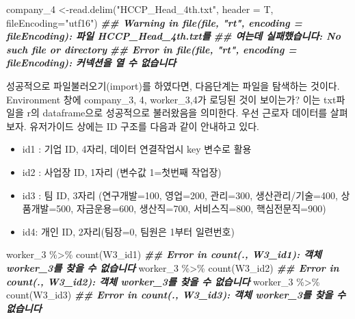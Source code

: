 \documentclass[
]{book}
\newenvironment{Shaded}{\begin{snugshade}}{\end{snugshade}}
\newcommand{\AttributeTok}[1]{\textcolor[rgb]{0.77,0.63,0.00}{#1}}
\newcommand{\DocumentationTok}[1]{\textcolor[rgb]{0.56,0.35,0.01}{\textbf{\textit{#1}}}}
\newcommand{\FunctionTok}[1]{\textcolor[rgb]{0.00,0.00,0.00}{#1}}
\newcommand{\NormalTok}[1]{#1}
\newcommand{\OtherTok}[1]{\textcolor[rgb]{0.56,0.35,0.01}{#1}}
\newcommand{\SpecialCharTok}[1]{\textcolor[rgb]{0.00,0.00,0.00}{#1}}
\newcommand{\StringTok}[1]{\textcolor[rgb]{0.31,0.60,0.02}{#1}}
\providecommand{\tightlist}{%
  \setlength{\itemsep}{0pt}\setlength{\parskip}{0pt}}
\theoremstyle{definition}
\theoremstyle{definition}
\theoremstyle{definition}
\theoremstyle{definition}
\theoremstyle{remark}
\begin{document}
\begin{Shaded}
\begin{Highlighting}[]
\NormalTok{company\_4 }\OtherTok{\textless{}{-}}\FunctionTok{read.delim}\NormalTok{(}\StringTok{"HCCP\_Head\_4th.txt"}\NormalTok{, }\AttributeTok{header =}\NormalTok{ T, }\AttributeTok{fileEncoding=}\StringTok{"utf16"}\NormalTok{)}
\DocumentationTok{\#\# Warning in file(file, "rt", encoding = fileEncoding): 파일 \textquotesingle{}HCCP\_Head\_4th.txt\textquotesingle{}를}
\DocumentationTok{\#\# 여는데 실패했습니다: No such file or directory}
\DocumentationTok{\#\# Error in file(file, "rt", encoding = fileEncoding): 커넥션을 열 수 없습니다}
\end{Highlighting}
\end{Shaded}

성공적으로 파일불러오기(import)를 하였다면, 다음단계는 파일을 탐색하는 것이다. Environment 창에 company\_3, 4, worker\_3,4가 로딩된 것이 보이는가? 이는 txt파일을 r의 dataframe으로 성공적으로 불러왔음을 의미한다. 우선 근로자 데이터를 살펴보자. 유저가이드 상에는 ID 구조를 다음과 같이 안내하고 있다.

\begin{itemize}
\tightlist
\item
  id1 : 기업 ID, 4자리, 데이터 연결작업시 key 변수로 활용
\item
  id2 : 사업장 ID, 1자리 (변수값 1=첫번째 작업장)
\item
  id3 : 팀 ID, 3자리 (연구개발=100, 영업=200, 관리=300, 생산관리/기술=400, 상품개발=500, 자금운용=600, 생산직=700, 서비스직=800, 핵심전문직=900)
\item
  id4: 개인 ID, 2자리(팀장=0, 팀원은 1부터 일련번호)
\end{itemize}

\begin{Shaded}
\begin{Highlighting}[]
\NormalTok{worker\_3 }\SpecialCharTok{\%\textgreater{}\%} 
  \FunctionTok{count}\NormalTok{(W3\_id1)}
\DocumentationTok{\#\# Error in count(., W3\_id1): 객체 \textquotesingle{}worker\_3\textquotesingle{}를 찾을 수 없습니다}
\NormalTok{worker\_3 }\SpecialCharTok{\%\textgreater{}\%} 
  \FunctionTok{count}\NormalTok{(W3\_id2)}
\DocumentationTok{\#\# Error in count(., W3\_id2): 객체 \textquotesingle{}worker\_3\textquotesingle{}를 찾을 수 없습니다}
\NormalTok{worker\_3 }\SpecialCharTok{\%\textgreater{}\%} 
  \FunctionTok{count}\NormalTok{(W3\_id3)}
\DocumentationTok{\#\# Error in count(., W3\_id3): 객체 \textquotesingle{}worker\_3\textquotesingle{}를 찾을 수 없습니다}
\end{Highlighting}
\end{Shaded}
\end{document}
